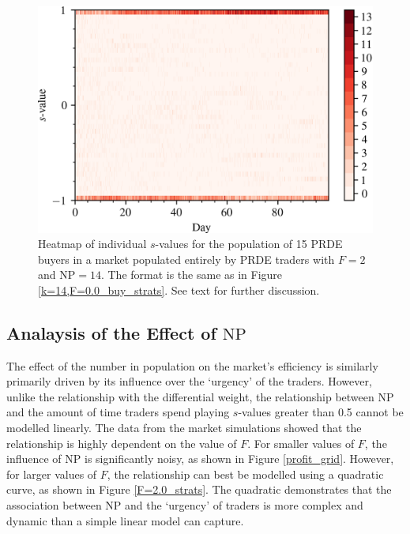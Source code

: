 \documentclass[conference]{IEEEtran}
\begin{document}
\begin{figure}[htbp]
    \centerline{\includegraphics[width=\columnwidth]{k=14,F=2.0_buy_strats.png}}
    \caption{
        Heatmap of individual $s$-values for the population of 15 PRDE buyers in a market populated entirely by PRDE traders with $F=2$ and $\mathrm{NP}=14$.
        The format is the same as in Figure \ref{k=14,F=0.0_buy_strats}.
        See text for further discussion.
    }
    \label{k=14,F=2.0_buy_strats}
\end{figure}

\subsection{Analaysis of the Effect of $\mathrm{NP}$}

The effect of the number in population on the market's efficiency is similarly primarily driven by its influence over the `urgency' of the traders.
However, unlike the relationship with the differential weight, the relationship between $\mathrm{NP}$ and the amount of time traders spend playing $s$-values greater than 0.5 cannot be modelled linearly.
The data from the market simulations showed that the relationship is highly dependent on the value of $F$.
For smaller values of $F$, the influence of $\mathrm{NP}$ is significantly noisy, as shown in Figure \ref{profit_grid}.
However, for larger values of $F$, the relationship can best be modelled using a quadratic curve, as shown in Figure  \ref{F=2.0_strats}.
The quadratic demonstrates that the association between $\mathrm{NP}$ and the `urgency' of traders is more complex and dynamic than a simple linear model can capture.
\end{document}
